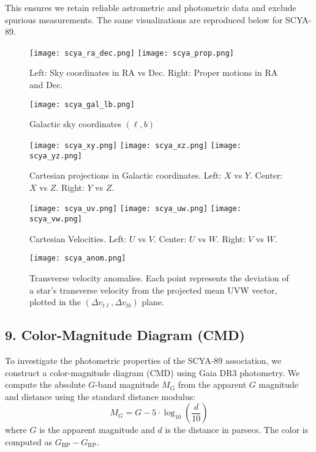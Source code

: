 \documentclass[11pt]{article}
\begin{document}
This ensures we retain reliable astrometric and photometric data and exclude spurious measurements. The same visualizations are reproduced below for SCYA-89.

\begin{figure}[H]
    \centering
    \texttt{[image: scya\_ra\_dec.png]}
    \texttt{[image: scya\_prop.png]}
    \caption{Left: Sky coordinates in RA vs Dec. Right: Proper motions in RA and Dec.}
    \label{fig:scya89_radec_pm}
\end{figure}

\begin{figure}[H]
    \centering
    \texttt{[image: scya\_gal\_lb.png]}
    \caption{Galactic sky coordinates $(\ell, b)$}
    \label{fig:scya89_gallb}
\end{figure}

\begin{figure}[H]
    \centering
    \texttt{[image: scya\_xy.png]}
    \texttt{[image: scya\_xz.png]}
    \texttt{[image: scya\_yz.png]}
    \caption{Cartesian projections in Galactic coordinates. Left: $X$ vs $Y$. Center: $X$ vs $Z$. Right: $Y$ vs $Z$.}
    \label{fig:scya89_xyz}
\end{figure}

\begin{figure}[H]
    \centering
    \texttt{[image: scya\_uv.png]}
    \texttt{[image: scya\_uw.png]}
    \texttt{[image: scya\_vw.png]}
    \caption{Cartesian Velocities. Left: $U$ vs $V$. Center: $U$ vs $W$. Right: $V$ vs $W$.}
    \label{fig:scya89_uvw}
\end{figure}

\begin{figure}[H]
    \centering
    \texttt{[image: scya\_anom.png]}
    \caption{Transverse velocity anomalies. Each point represents the deviation of a star's transverse velocity from the projected mean UVW vector, plotted in the $(\Delta v_{t\ell}, \Delta v_{tb})$ plane.}
    \label{fig:scya89_vtanomaly}
\end{figure}


\subsection*{9. Color-Magnitude Diagram (CMD)}
To investigate the photometric properties of the SCYA-89 association, we construct a color-magnitude diagram (CMD) using Gaia DR3 photometry. We compute the absolute $G$-band magnitude $M_G$ from the apparent $G$ magnitude and distance using the standard distance modulus:
\begin{equation}
    M_G = G - 5 \cdot \log_{10}\left(\frac{d}{10}\right)
    \label{eq:mg}
\end{equation}
where $G$ is the apparent magnitude and $d$ is the distance in parsecs. The color is computed as $G_{\text{BP}} - G_{\text{RP}}$.
\end{document}
